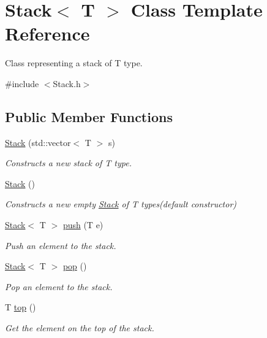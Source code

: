\hypertarget{class_stack}{}\section{Stack$<$ T $>$ Class Template Reference}
\label{class_stack}


Class representing a stack of T type.  




{\ttfamily \#include $<$Stack.\+h$>$}

\subsection*{Public Member Functions}
\begin{DoxyCompactItemize}
\item 
\hyperlink{class_stack_acf1a315995090bf9cf957ac84175c82c}{Stack} (std\+::vector$<$ T $>$ s)
\begin{DoxyCompactList}\small\item\em Constructs a new stack of T type. \end{DoxyCompactList}\item 
\mbox{\label{class_stack_aefee698059467258bbd79045aca62a63}} 
\hyperlink{class_stack_aefee698059467258bbd79045aca62a63}{Stack} ()
\begin{DoxyCompactList}\small\item\em Constructs a new empty \hyperlink{class_stack}{Stack} of T types(default constructor) \end{DoxyCompactList}\item 
\hyperlink{class_stack}{Stack}$<$ T $>$ \hyperlink{class_stack_a2f702496e109485c2ce9261f0c629dd1}{push} (T e)
\begin{DoxyCompactList}\small\item\em Push an element to the stack. \end{DoxyCompactList}\item 
\hyperlink{class_stack}{Stack}$<$ T $>$ \hyperlink{class_stack_a79085ca78d75f61838c1c2b8f9de968d}{pop} ()
\begin{DoxyCompactList}\small\item\em Pop an element to the stack. \end{DoxyCompactList}\item 
T \hyperlink{class_stack_ad461f6de40c8672dbf743068f4515061}{top} ()
\begin{DoxyCompactList}\small\item\em Get the element on the top of the stack. \end{DoxyCompactList}\item 

\end{DoxyCompactItemize}
